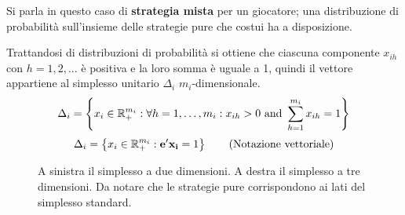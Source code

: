 Si parla in questo caso di \textbf{strategia mista} per un giocatore; una distribuzione di probabilità sull'insieme delle strategie pure che costui ha a disposizione.

\newpage

Trattandosi di distribuzioni di probabilità si ottiene che ciascuna componente $x_{ih}$ con $h = {1,2,...}$ è positiva e la loro somma è uguale a 1, quindi il vettore appartiene al simplesso unitario $\Delta_i$ $m_i$-dimensionale.
\begin{align}
	\Delta_i = \left\{ x_i \in \mathbb{R}^{m_i}_+ : \forall h = 1, \dots, m_i : x_{ih} > 0 \text{ and } \sum_{h=1}^{m_i} x_{ih} = 1 \right\}
\end{align}
\begin{align*}
	\Delta_i = \left\{ x_i \in \mathbb{R}^{m_i}_+ : \mathbf{e}'\mathbf{x_i} = 1 \right\} \tag{Notazione vettoriale}
\end{align*}


\begin{figure}[h!]
	\centering
	\qquad\qquad
	\caption[Simplesso 2D e 3D]{A sinistra il simplesso a due dimensioni. A destra il simplesso a tre dimensioni. Da notare che le strategie pure corrispondono ai lati del simplesso standard.}
\end{figure}

